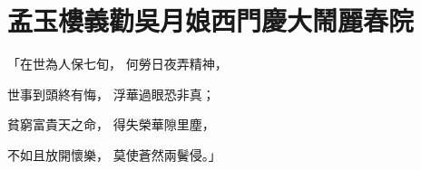 %

\chapter{孟玉樓義勸吳月娘\KG 西門慶大鬧麗春院}

\begin{showcontents}{}



「在世為人保七旬，  何勞日夜弄精神，

世事到頭終有悔，  浮華過眼恐非真；

貧窮富貴天之命，  得失榮華隙里塵，

不如且放開懷樂，  莫使蒼然兩鬢侵。」


\end{showcontents}
